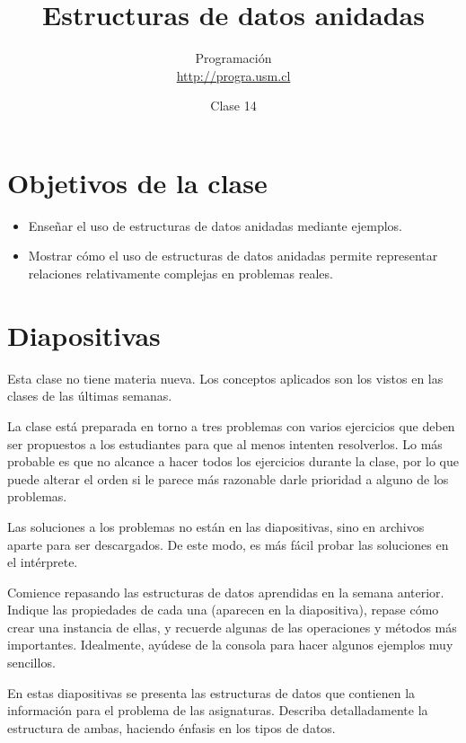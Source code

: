 \documentclass[10pt]{article}
\title{Estructuras de datos anidadas}
\author{Programación \\ \url{http://progra.usm.cl}}
\date{Clase 14}
\begin{document}
  \maketitle

  \section*{Objetivos de la clase}
  \begin{itemize}
    \item Enseñar el uso de estructuras de datos anidadas mediante ejemplos.
    \item Mostrar cómo el uso de estructuras de datos anidadas
      permite representar relaciones relativamente complejas en problemas reales.
  \end{itemize}

  \section*{Diapositivas}

  Esta clase no tiene materia nueva.
  Los conceptos aplicados son los vistos en las clases de las últimas semanas.

  La clase está preparada en torno a tres problemas con varios ejercicios
  que deben ser propuestos a los estudiantes para que al menos intenten resolverlos.
  Lo más probable es que no alcance a hacer todos los ejercicios durante la clase,
  por lo que puede alterar el orden si le parece más razonable
  darle prioridad a alguno de los problemas.

  Las soluciones a los problemas no están en las diapositivas,
  sino en archivos aparte para ser descargados.
  De este modo, es más fácil probar las soluciones en el intérprete.


  Comience repasando las estructuras de datos aprendidas en la semana anterior.
  Indique las propiedades de cada una (aparecen en la diapositiva),
  repase cómo crear una instancia de ellas,
  y recuerde algunas de las operaciones y métodos más importantes.
  Idealmente, ayúdese de la consola para hacer algunos ejemplos muy sencillos.


  En estas diapositivas se presenta las estructuras de datos
  que contienen la información para el problema de las asignaturas.
  Describa detalladamente la estructura de ambas,
  haciendo énfasis en los tipos de datos.
\end{document}
